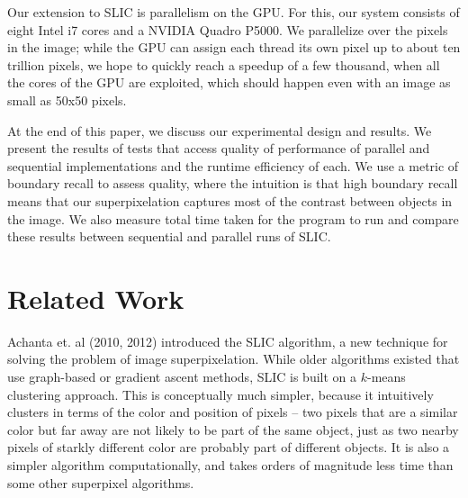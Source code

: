 \documentclass[11pt,twocolumn]{article}
\begin{document}
Our extension to SLIC is parallelism on the GPU. For this, our system consists of eight Intel i7 cores and a NVIDIA Quadro P5000. We parallelize over the pixels in the image; while the GPU can assign each thread its own pixel up to about ten trillion pixels, we hope to quickly reach a speedup of a few thousand, when all the cores of the GPU are exploited, which should happen even with an image as small as 50x50 pixels.

At the end of this paper, we discuss our experimental design and results. We present the results of tests that access quality of performance of parallel and sequential implementations and the runtime efficiency of each. We use a metric of boundary recall to assess quality, where the intuition is that high boundary recall means that our superpixelation captures most of the contrast between objects in the image. We also measure total time taken for the program to run and compare these results between sequential and parallel runs of SLIC.

\section {Related Work}\label{relwork}



Achanta et. al (2010, 2012) \cite{slic}\cite{slic2012} introduced the SLIC algorithm, a new technique for solving the problem of image superpixelation. While older algorithms existed that use graph-based or gradient ascent methods, SLIC is built on a $k$-means clustering approach. This is conceptually much simpler, because it intuitively clusters in terms of the color and position of pixels -- two pixels that are a similar color but far away are not likely to be part of the same object, just as two nearby pixels of starkly different color are probably part of different objects. It is also a simpler algorithm computationally, and takes orders of magnitude less time than some other superpixel algorithms. 
\end{document}
